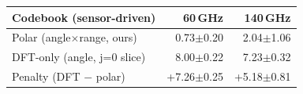 \begin{tabular}{lrr}
\toprule
Codebook (sensor-driven) & 60\,GHz & 140\,GHz \\
\midrule
Polar (angle$\times$range, ours) & 0.73$\pm$0.20 & 2.04$\pm$1.06 \\
DFT-only (angle, j=0 slice) & 8.00$\pm$0.22 & 7.23$\pm$0.32 \\
Penalty (DFT $-$ polar) & +7.26$\pm$0.25 & +5.18$\pm$0.81 \\
\bottomrule
\end{tabular}
